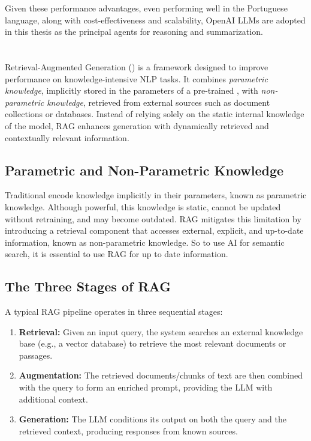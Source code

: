 Given these performance advantages, even performing well in the Portuguese language, along with cost-effectiveness and scalability, OpenAI \gls{LLM}s are adopted in this thesis as the principal agents for reasoning and summarization.


\section{}
\label{sec:rag}

Retrieval-Augmented Generation () is a framework designed to improve performance on knowledge-intensive \gls{NLP} tasks. It combines \textit{parametric knowledge}, implicitly stored in the parameters of a pre-trained , with \textit{non-parametric knowledge}, retrieved from external sources such as document collections or databases. Instead of relying solely on the static internal knowledge of the model, RAG enhances generation with dynamically retrieved and contextually relevant information.

\subsection{Parametric and Non-Parametric Knowledge}
Traditional  encode knowledge implicitly in their parameters, known as parametric knowledge. Although powerful, this knowledge is static, cannot be updated without retraining, and may become outdated.  
\gls{RAG} mitigates this limitation by introducing a retrieval component that accesses external, explicit, and up-to-date information, known as non-parametric knowledge. So to use AI for semantic search, it is essential to use \gls{RAG} for up to date information.

\subsection{The Three Stages of RAG}
A typical RAG pipeline operates in three sequential stages:
\begin{enumerate}
    \item \textbf{Retrieval:} Given an input query, the system searches an external knowledge base (e.g., a vector database) to retrieve the most relevant documents or passages.  
    \item \textbf{Augmentation:} The retrieved documents/chunks of text are then combined with the query to form an enriched prompt, providing the \gls{LLM} with additional context.  
    \item \textbf{Generation:} The \gls{LLM} conditions its output on both the query and the retrieved context, producing responses from known sources. 
\end{enumerate}

